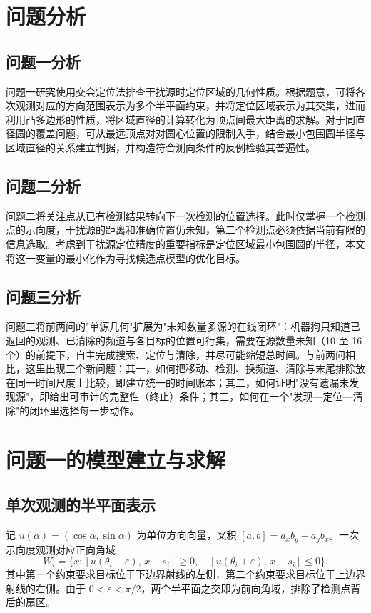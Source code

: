 \documentclass[UTF8,a4paper,zihao=-4,fontset=none]{ctexart}
\begin{document}
\section{问题分析}

\subsection{问题一分析}

问题一研究使用交会定位法排查干扰源时定位区域的几何性质。根据题意，可将各次观测对应的方向范围表示为多个半平面约束，并将定位区域表示为其交集，进而利用凸多边形的性质，将区域直径的计算转化为顶点间最大距离的求解。对于同直径圆的覆盖问题，可从最远顶点对对圆心位置的限制入手，结合最小包围圆半径与区域直径的关系建立判据，并构造符合测向条件的反例检验其普遍性。

\subsection{问题二分析}

问题二将关注点从已有检测结果转向下一次检测的位置选择。此时仅掌握一个检测点的示向度，干扰源的距离和准确位置仍未知，第二个检测点必须依据当前有限的信息选取。考虑到干扰源定位精度的重要指标是定位区域最小包围圆的半径，本文将这一变量的最小化作为寻找候选点模型的优化目标。

\subsection{问题三分析}

问题三将前两问的"单源几何"扩展为"未知数量多源的在线闭环"：机器狗只知道已返回的观测、已清除的频道与各目标的位置可行集，需要在源数量未知（10 至 16 个）的前提下，自主完成搜索、定位与清除，并尽可能缩短总时间。与前两问相比，这里出现三个新问题：其一，如何把移动、检测、换频道、清除与末尾排除放在同一时间尺度上比较，即建立统一的时间账本；其二，如何证明"没有遗漏未发现源"，即给出可审计的完整性（终止）条件；其三，如何在一个"发现—定位—清除"的闭环里选择每一步动作。

\section{问题一的模型建立与求解}

\subsection{单次观测的半平面表示}

记 $u(\alpha)=(\cos\alpha,\sin\alpha)$ 为单位方向向量，叉积 $[a,b]=a_xb_y-a_yb_x$。一次示向度观测对应正向角域
\begin{equation}
  W_i=\{x:[u(\theta_i-\varepsilon),\,x-s_i]\ge0,\quad [u(\theta_i+\varepsilon),\,x-s_i]\le0\}.
  \label{eq:wedge}
\end{equation}
其中第一个约束要求目标位于下边界射线的左侧，第二个约束要求目标位于上边界射线的右侧。由于 $0<\varepsilon<\pi/2$，两个半平面之交即为前向角域，排除了检测点背后的扇区。
\end{document}
